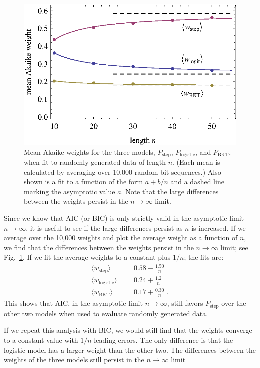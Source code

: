 \documentclass{edm_template}
\begin{document}
\begin{figure}
   \centering\includegraphics{mean-weights.eps}
  \caption{Mean Akaike weights for the three models, 
   $P_\mathrm{step}$, $P_\mathrm{logistic}$, and $P_\mathrm{BKT}$, 
   when fit to randomly generated data of length $n$.
   (Each mean is calculated by averaging over 10,000 random bit sequences.)
   Also shown is a fit to a function of the form $a+b/n$ and
   a dashed line marking the asymptotic value $a$.
   Note that the large differences between the weights persist
   in the $n\to\infty$ limit.}\label{meanweight}
\end{figure}

Since we know that AIC (or BIC) is only strictly valid in
the asymptotic limit $n\to\infty$, it is useful to see if
the large differences persist as $n$ is increased.
If we average over the 10,000 weights and plot the average weight 
as a function of $n$, we find
that the differences between the weights persist
in the $n\to\infty$ limit;  see Fig.~\ref{meanweight}.
If we fit the average weights to a constant plus $1/n$;
the fits are:
%
\begin{eqnarray}
 \langle w_\mathrm{step}\rangle &=& 0.58 - \frac{1.50}{n} \\
 \langle w_\mathrm{logistic}\rangle &=& 0.24 + \frac{1.2}{n} \\
 \langle w_\mathrm{BKT}\rangle &=& 0.17+\frac{0.30}{n} \; .
\end{eqnarray}
%
This shows that AIC, in the asymptotic limit $n\to\infty$, 
still favors  $P_\mathrm{step}$ over the other two models
when used to evaluate randomly generated data.

If we repeat this analysis with BIC, we would still
find that the weights converge to a constant value with 
$1/n$ leading errors.  The only difference is that the logistic
model has a larger weight than the other two. 
The differences between the weights of the three models still persist
in the $n\to\infty$ limit 
\end{document}
